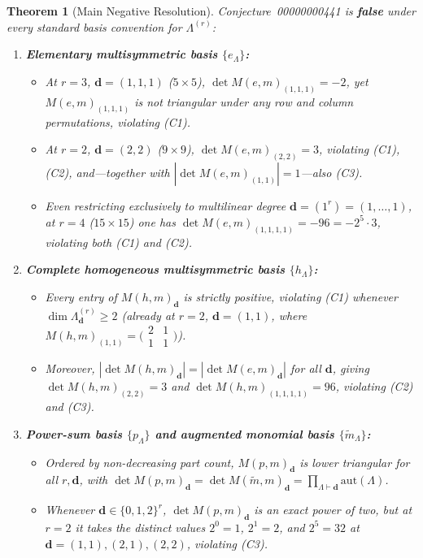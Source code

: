 \documentclass[11pt,a4paper]{article}
\newcommand{\smmat}[1]{\bigl(\begin{smallmatrix}#1\end{smallmatrix}\bigr)}
\newtheorem{theorem}{Theorem}[section]
\theoremstyle{definition}
\theoremstyle{remark}
\newcommand{\aut}{\mathrm{aut}}
\newcommand{\vecd}{\mathbf{d}}
\begin{document}
\begin{theorem}[Main Negative Resolution]\label{thm:main}
Conjecture~00000000441 is \textbf{false} under every standard basis convention for $\Lambda^{(r)}$:
\begin{enumerate}
  \setlength{\itemsep}{3pt}
  \item[(a)] \textbf{Elementary multisymmetric basis $\{e_\Lambda\}$:}
  \begin{itemize}
    \setlength{\itemsep}{1pt}
    \item At $r = 3$, $\vecd = (1,1,1)$ ($5 \times 5$), $\det M(e,m)_{(1,1,1)} = -2$, yet $M(e,m)_{(1,1,1)}$ is not triangular under any row and column permutations, violating \emph{(C1)}.
    \item At $r = 2$, $\vecd = (2,2)$ ($9 \times 9$), $\det M(e,m)_{(2,2)} = 3$, violating \emph{(C1)}, \emph{(C2)}, and---together with $|\det M(e,m)_{(1,1)}| = 1$---also \emph{(C3)}.
    \item Even restricting exclusively to multilinear degree $\vecd = (1^r) = (1,\dots,1)$, at $r = 4$ ($15 \times 15$) one has $\det M(e,m)_{(1,1,1,1)} = -96 = -2^5 \cdot 3$, violating both \emph{(C1)} and \emph{(C2)}.
  \end{itemize}
  \item[(b)] \textbf{Complete homogeneous multisymmetric basis $\{h_\Lambda\}$:}
  \begin{itemize}
    \setlength{\itemsep}{1pt}
    \item Every entry of $M(h,m)_{\vecd}$ is strictly positive, violating \emph{(C1)} whenever $\dim \Lambda^{(r)}_{\vecd} \ge 2$ (already at $r = 2$, $\vecd = (1,1)$, where $M(h,m)_{(1,1)} = \smmat{2 & 1 \\ 1 & 1}$).
    \item Moreover, $|\det M(h,m)_{\vecd}| = |\det M(e,m)_{\vecd}|$ for all $\vecd$, giving $\det M(h,m)_{(2,2)} = 3$ and $\det M(h,m)_{(1,1,1,1)} = 96$, violating \emph{(C2)} and \emph{(C3)}.
  \end{itemize}
  \item[(c)] \textbf{Power-sum basis $\{p_\Lambda\}$ and augmented monomial basis $\{\tilde{m}_\Lambda\}$:}
  \begin{itemize}
    \setlength{\itemsep}{1pt}
    \item Ordered by non-decreasing part count, $M(p,m)_{\vecd}$ \emph{is} lower triangular for all $r, \vecd$, with $\det M(p,m)_{\vecd} = \det M(\tilde{m},m)_{\vecd} = \prod_{\Lambda \vdash \vecd} \aut(\Lambda)$.
    \item Whenever $\vecd \in \{0,1,2\}^r$, $\det M(p,m)_{\vecd}$ is an exact power of two, but at $r = 2$ it takes the distinct values $2^0 = 1$, $2^1 = 2$, and $2^5 = 32$ at $\vecd = (1,1), (2,1), (2,2)$, violating \emph{(C3)}.

\end{itemize}
\end{enumerate}
\end{theorem}
\end{document}
